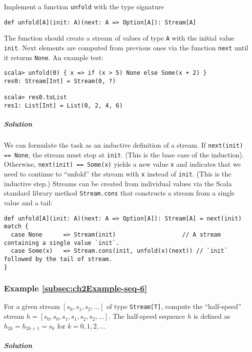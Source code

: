 Implement a function
\lstinline!unfold! with the type signature
\begin{lstlisting}
def unfold[A](init: A)(next: A => Option[A]): Stream[A]
\end{lstlisting}
The function should create a stream of values of type \lstinline!A!
with the initial value \lstinline!init!. Next elements are computed
from previous ones via the function \lstinline!next! until it returns
\lstinline!None!. An example test:
\begin{lstlisting}
scala> unfold(0) { x => if (x > 5) None else Some(x + 2) }
res0: Stream[Int] = Stream(0, ?)

scala> res0.toList
res1: List[Int] = List(0, 2, 4, 6)
\end{lstlisting}


\subparagraph{Solution}

We can formulate the task as an inductive definition of a stream.
If \lstinline!next(init) == None!, the stream must stop at \lstinline!init!.
(This is the base case of the induction). Otherwise, \lstinline!next(init) == Some(x)!
yields a new value \lstinline!x! and indicates that we need to continue
to \textsf{``}unfold\textsf{''} the stream with \lstinline!x! instead of \lstinline!init!.
(This is the inductive step.) Streams can be created from individual
values via the Scala standard library method \lstinline!Stream.cons!
that constructs a stream from a single value and a tail:
\begin{lstlisting}
def unfold[A](init: A)(next: A => Option[A]): Stream[A] = next(init) match {
  case None      => Stream(init)                   // A stream containing a single value `init`.
  case Some(x)   => Stream.cons(init, unfold(x)(next)) // `init` followed by the tail of stream.
}
\end{lstlisting}


\subsubsection{Example \label{subsec:ch2Example-seq-6}\ref{subsec:ch2Example-seq-6}}

For a given stream $\left[s_{0},s_{1},s_{2},...\right]$ of type \lstinline!Stream[T]!,
compute the \textsf{``}half-speed\textsf{''} stream $h=\left[s_{0},s_{0},s_{1},s_{1},s_{2},s_{2},...\right]$.
The half-speed sequence $h$ is defined as $h_{2k}=h_{2k+1}=s_{k}$
for $k=0,1,2,...$

\subparagraph{Solution}

